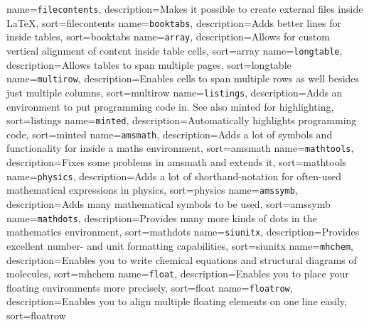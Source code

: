 {
	name={\tt filecontents},
	description={Makes it possible to create external files inside \LaTeX},
	sort=filecontents
}
{
	name={\tt booktabs},
	description={Adds better lines for inside tables},
	sort=booktabs
}
{
	name={\tt array},
	description={Allows for custom vertical alignment of content inside table cells},
	sort=array
}
{
	name={\tt longtable},
	description={Allows tables to span multiple pages},
	sort=longtable
}
{
	name={\tt multirow},
	description={Enables cells to span multiple rows as well besides just multiple columns},
	sort=multirow
}
{
	name={\tt listings},
	description={Adds an environment to put programming code in. See also \gls{minted} for highlighting},
	sort=listings
}
{
	name={\tt minted},
	description={Automatically highlights programming code},
	sort=minted
}
{
	name={\tt amsmath},
	description={Adds a lot of symbols and functionality for inside a maths environment},
	sort=amsmath
}
{
	name={\tt mathtools},
	description={Fixes some problems in \gls{amsmath} and extends it},
	sort=mathtools
}
{
	name={\tt physics},
	description={Adds a lot of shorthand-notation for often-used mathematical expressions in physics},
	sort=physics
}
{
	name={\tt amssymb},
	description={Adds many mathematical symbols to be used},
	sort=amssymb
}
{
	name={\tt mathdots},
	description={Provides many more kinds of dots in the mathematics environment},
	sort=mathdots
}
{
	name={\tt siunitx},
	description={Provides excellent number- and unit formatting capabilities},
	sort=siunitx
}
{
	name={\tt mhchem},
	description={Enables you to write chemical equations and structural diagrams of molecules},
	sort=mhchem
}
{
	name={\tt float},
	description={Enables you to place your floating environments more precisely},
	sort=float
}
{
	name={\tt floatrow},
	description={Enables you to align multiple floating elements on one line easily},
	sort=floatrow
}